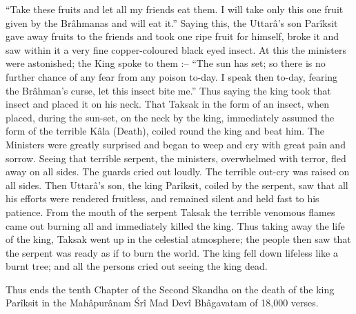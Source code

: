 ``Take these fruits and let all my friends eat them. I will take only this one fruit given by the Br\^ahmanas and will eat it.'' Saying this, the Uttar\^a's son Par\^iksit gave away fruits to the friends and took one ripe fruit for himself, broke it and saw within it a very fine copper-coloured black eyed insect. At this the ministers were astonished; the King spoke to them :-- ``The sun has set; so there is no further chance of any fear from any poison to-day. I speak then to-day, fearing the Br\^ahman's curse, let this insect bite me.'' Thus saying the king took that insect and placed it on his neck. That Taksak in the form of an insect, when placed, during the sun-set, on the neck by the king, immediately assumed the form of the terrible K\^ala (Death), coiled round the king and beat him. The Ministers were greatly surprised and began to weep and cry with great pain and sorrow. Seeing that terrible serpent, the ministers, overwhelmed with terror, fled away on all sides. The guards cried out loudly. The terrible out-cry was raised on all sides. Then Uttar\^a's son, the king Par\^iksit, coiled by the serpent, saw that all his efforts were rendered fruitless, and remained silent and held fast to his patience. From the mouth of the serpent Taksak the terrible venomous flames came out burning all and immediately killed the king. Thus taking away the life of the king, Taksak went up in the celestial atmosphere; the people then saw that the serpent was ready as if to burn the world. The king fell down lifeless like a burnt tree; and all the persons cried out seeing the king dead.

Thus ends the tenth Chapter of the Second Skandha on the death of the king Par\^iksit in the Mah\^apur\^anam \'Sr\^i Mad Dev\^i Bh\^agavatam of 18,000 verses.